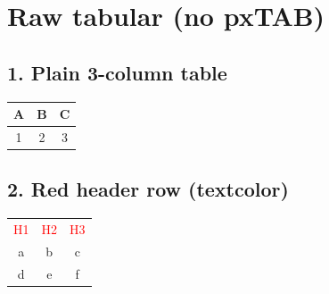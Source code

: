 \documentclass{article}
\begin{document}
\section*{Raw tabular (no pxTAB)}

\subsection*{1. Plain 3-column table}
\begin{tabular}{ccc}
  A & B & C \\
  \hline
  1 & 2 & 3
\end{tabular}

\bigskip
\subsection*{2. Red header row (textcolor)}
\begin{tabular}{ccc}
  \textcolor{red}{H1} & \textcolor{red}{H2} & \textcolor{red}{H3} \\
  a & b & c \\
  d & e & f
\end{tabular}
\end{document}
